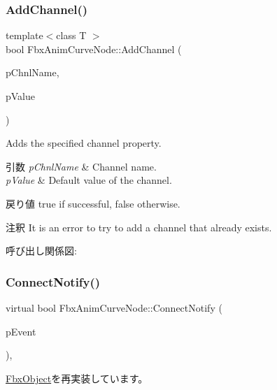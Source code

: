 \subsubsection{\texorpdfstring{Add\+Channel()}{AddChannel()}}
{\footnotesize\ttfamily template$<$class T $>$ \\
bool Fbx\+Anim\+Curve\+Node\+::\+Add\+Channel (\begin{DoxyParamCaption}\item[{const char $\ast$}]{p\+Chnl\+Name,  }\item[{T const \&}]{p\+Value }\end{DoxyParamCaption})}

Adds the specified channel property. 
\begin{DoxyParams}{引数}
{\em p\+Chnl\+Name} & Channel name. \\
\hline
{\em p\+Value} & Default value of the channel. \\
\hline
\end{DoxyParams}
\begin{DoxyReturn}{戻り値}
{\ttfamily true} if successful, {\ttfamily false} otherwise. 
\end{DoxyReturn}
\begin{DoxyRemark}{注釈}
It is an error to try to add a channel that already exists. 
\end{DoxyRemark}
呼び出し関係図\+:
\mbox{\label{class_fbx_anim_curve_node_a0a3743b600796ab2b87dea299654b98c}} 
\subsubsection{\texorpdfstring{Connect\+Notify()}{ConnectNotify()}}
{\footnotesize\ttfamily virtual bool Fbx\+Anim\+Curve\+Node\+::\+Connect\+Notify (\begin{DoxyParamCaption}\item[{const \hyperlink{class_fbx_connect_event}{Fbx\+Connect\+Event} \&}]{p\+Event }\end{DoxyParamCaption})\hspace{0.3cm}{\ttfamily [protected]}, {\ttfamily [virtual]}}



\hyperlink{class_fbx_object_ab7a400f3829d1f0da57d3d78c8168dd0}{Fbx\+Object}を再実装しています。

